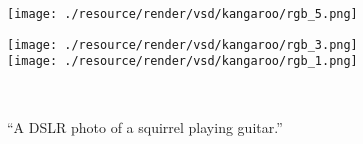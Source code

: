 \begin{figure*}[t!]
\begin{minipage}[c]{1\linewidth}
{            \begin{minipage}[c]{0.13\linewidth}
                \texttt{[image: ./resource/render/vsd/kangaroo/rgb\_5.png]}
            \end{minipage}
            \hspace{-1.8mm}
            \begin{minipage}[c]{0.065\linewidth}
                \texttt{[image: ./resource/render/vsd/kangaroo/rgb\_3.png]}\\
                \vspace{-4.2mm}
                \texttt{[image: ./resource/render/vsd/kangaroo/rgb\_1.png]}
            \end{minipage}
        }
        \hspace{-2mm}
    \end{minipage}
    \\

    \vspace{1.5mm}
    \begin{minipage}[c]{1\linewidth}
        \parbox{1\linewidth}{\centering ``A DSLR photo of a squirrel playing guitar.''}
        \vspace{-7mm}


\end{minipage}
\end{figure*}

